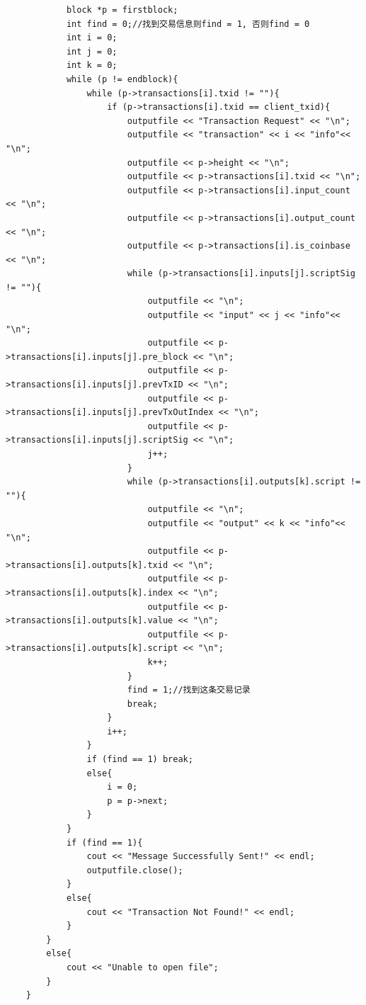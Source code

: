 \documentclass[10pt,a4paper]{article}
\begin{document}
\begin{verbatim}
            block *p = firstblock;
            int find = 0;//找到交易信息则find = 1, 否则find = 0
            int i = 0;
            int j = 0;
            int k = 0;
            while (p != endblock){
                while (p->transactions[i].txid != ""){
                    if (p->transactions[i].txid == client_txid){
                        outputfile << "Transaction Request" << "\n";
                        outputfile << "transaction" << i << "info"<< "\n";
                        outputfile << p->height << "\n";
                        outputfile << p->transactions[i].txid << "\n";
                        outputfile << p->transactions[i].input_count << "\n";
                        outputfile << p->transactions[i].output_count << "\n";
                        outputfile << p->transactions[i].is_coinbase << "\n";
                        while (p->transactions[i].inputs[j].scriptSig != ""){
                            outputfile << "\n";
                            outputfile << "input" << j << "info"<< "\n";
                            outputfile << p->transactions[i].inputs[j].pre_block << "\n";
                            outputfile << p->transactions[i].inputs[j].prevTxID << "\n";
                            outputfile << p->transactions[i].inputs[j].prevTxOutIndex << "\n";
                            outputfile << p->transactions[i].inputs[j].scriptSig << "\n";
                            j++;
                        }
                        while (p->transactions[i].outputs[k].script != ""){
                            outputfile << "\n";
                            outputfile << "output" << k << "info"<< "\n";
                            outputfile << p->transactions[i].outputs[k].txid << "\n";
                            outputfile << p->transactions[i].outputs[k].index << "\n";
                            outputfile << p->transactions[i].outputs[k].value << "\n";
                            outputfile << p->transactions[i].outputs[k].script << "\n";
                            k++;
                        }                
                        find = 1;//找到这条交易记录
                        break;
                    }
                    i++;
                }
                if (find == 1) break;
                else{
                    i = 0;
                    p = p->next;
                }
            }
            if (find == 1){
                cout << "Message Successfully Sent!" << endl;
                outputfile.close();
            }
            else{
                cout << "Transaction Not Found!" << endl;
            }
        }
        else{
            cout << "Unable to open file";
        }
    }
    

\end{verbatim}
\end{document}
